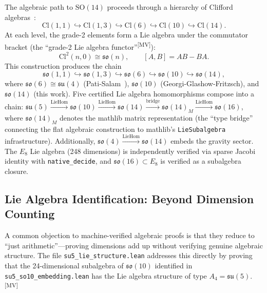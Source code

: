 \documentclass[aps,prd,twocolumn,showpacs,preprintnumbers,superscriptaddress,floatfix]{revtex4-2}
\newcommand{\so}{\mathfrak{so}}
\newcommand{\su}{\mathfrak{su}}
\newcommand{\Cl}{\mathrm{Cl}}
\newcommand{\MV}{\textsuperscript{[MV]}}
\begin{document}
The algebraic path to $\mathrm{SO}(14)$ proceeds through a hierarchy of
Clifford algebras~\cite{arnoldy2026aaca}: %
\begin{equation}\label{eq:hierarchy}
  \Cl(1,1) \hookrightarrow \Cl(1,3) \hookrightarrow \Cl(6)
    \hookrightarrow \Cl(10) \hookrightarrow \Cl(14).
\end{equation}
At each level, the grade-2 elements form a Lie algebra under the
commutator bracket (the ``grade-2 Lie algebra functor''\MV):
\begin{equation}
  \Cl^2(n,0) \cong \so(n), \qquad [A, B] = AB - BA.
\end{equation}
This construction produces the chain %
\begin{equation}
  \so(1,1) \hookrightarrow \so(1,3) \hookrightarrow \so(6)
    \hookrightarrow \so(10) \hookrightarrow \so(14),
\end{equation}
where $\so(6) \cong \su(4)$ (Pati-Salam~\cite{patisalam1974}), $\so(10)$ (Georgi-Glashow-Fritzsch),
and $\so(14)$ (this work).  Five certified Lie algebra homomorphisms compose into a chain:
$\su(5) \xrightarrow{\text{LieHom}} \so(10) \xrightarrow{\text{LieHom}} \so(14) \xrightarrow{\text{bridge}} \so(14)_M \xrightarrow{\text{LieHom}} \so(16)$,
where $\so(14)_M$ denotes the mathlib matrix representation (the ``type bridge'' connecting the flat algebraic construction to mathlib's \texttt{LieSubalgebra} infrastructure).  Additionally, $\so(4) \xrightarrow{\text{LieHom}} \so(14)$ embeds the gravity sector.  The $E_8$ Lie algebra (248 dimensions) is independently verified via sparse Jacobi identity with \texttt{native\_decide}, and $\so(16) \subset E_8$ is verified as a subalgebra closure.

\subsection{Lie Algebra Identification: Beyond Dimension Counting}
\label{sec:lie-identification}

A common objection to machine-verified algebraic proofs is that
they reduce to ``just arithmetic''---proving dimensions add up
without verifying genuine algebraic structure.  The file
\texttt{su5\_lie\_structure.lean} addresses this directly by proving
that the 24-dimensional subalgebra of $\so(10)$ identified in
\texttt{su5\_so10\_embedding.lean} has the Lie algebra structure of
type $A_4 = \su(5)$.\MV
\end{document}
